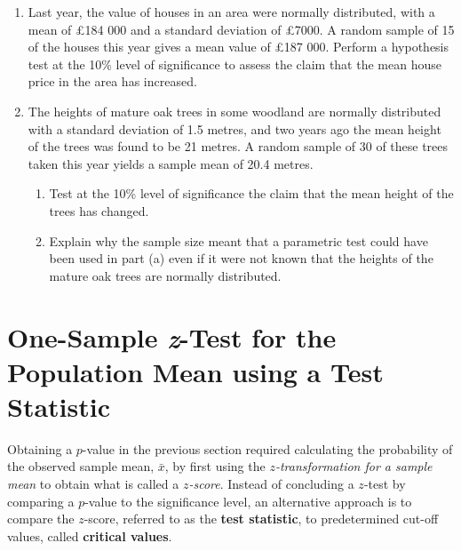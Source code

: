 \documentclass[
  11pt,
]{book}
\begin{document}
\begin{enumerate}[resume]
    \begin{enumerate}
        \item State one assumption required for the valid use of a $z$-test.
        \item Perform a hypothesis test to assess the evidence at the 1\% level of significance that the mean mass of his newborn lambs is less than 4.2 kilograms.
    \end{enumerate}
    \item Last year, the value of houses in an area were normally distributed, with a mean of £184 000 and a standard deviation of £7000. A random sample of 15 of the houses this year gives a mean value of £187 000. Perform a hypothesis test at the 10\% level of significance to assess the claim that the mean house price in the area has increased.
    \item The heights of mature oak trees in some woodland are normally distributed with a standard deviation of 1.5 metres, and two years ago the mean height of the trees was found to be 21 metres. A random sample of 30 of these trees taken this year yields a sample mean of 20.4 metres. 
    \begin{enumerate}
        \item Test at the 10\% level of significance the claim that the mean height of the trees has changed.
        \item Explain why the sample size meant that a parametric test could have been used in part (a) even if it were not known that the heights of the mature oak trees are normally distributed.
    \end{enumerate}
\end{enumerate}

\pagebreak

\section{\texorpdfstring{One-Sample \textit{z}-Test for the Population Mean using a Test Statistic}{One-Sample -Test for the Population Mean using a Test Statistic}}\label{one-sample--test-for-the-population-mean-using-a-test-statistic}

Obtaining a \(p\)-value in the previous section required calculating the probability of the observed sample mean, \(\bar{x}\), by first using the \(z\)\emph{-transformation for a sample mean} to obtain what is called a \(z\)\emph{-score}. Instead of concluding a \(z\)-test by comparing a \(p\)-value to the significance level, an alternative approach is to compare the \(z\)-score, referred to as the \textbf{test statistic}, to predetermined cut-off values, called \textbf{critical values}.
\end{document}
